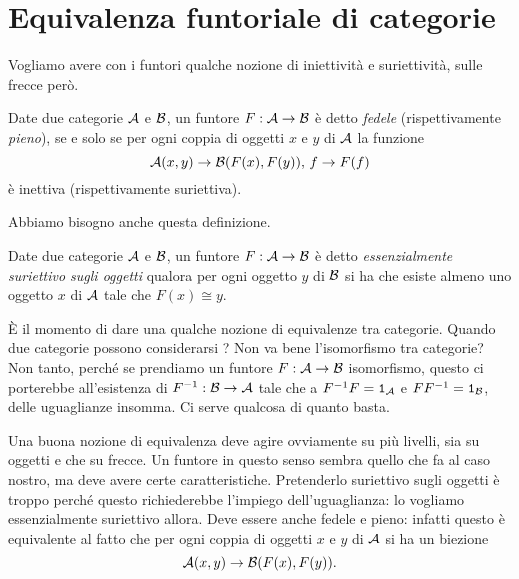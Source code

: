
\section{Equivalenza funtoriale di categorie}

Vogliamo avere con i funtori qualche nozione di iniettività e suriettività, sulle frecce però.

\begin{definizione}
Date due categorie \(\mathcal A\) e \(\mathcal B\), un funtore \(F : \mathcal A \to \mathcal B\) è detto {\em fedele} (rispettivamente {\em pieno}), se e solo se per ogni coppia di oggetti \(x\) e \(y\) di \(\mathcal A\) la funzione
\[\mathcal A(x, y) \to \mathcal B(F(x), F(y)),\, f \to F(f)\]
è inettiva (rispettivamente suriettiva).
\end{definizione}

Abbiamo bisogno anche questa definizione.

\begin{definizione}
Date due categorie \(\mathcal A\) e \(\mathcal B\), un funtore \(F : \mathcal A \to \mathcal B\) è detto {\em essenzialmente suriettivo sugli oggetti} qualora per ogni oggetto \(y\) di \(\mathcal B\) si ha che esiste almeno uno oggetto \(x\) di \(\mathcal A\) tale che \(F(x) \cong y\).
\end{definizione}

È il momento di dare una qualche nozione di equivalenze tra categorie. Quando due categorie possono considerarsi ? Non va bene l'isomorfismo tra categorie? Non tanto, perché se prendiamo un funtore \(F : \mathcal A \to \mathcal B\) isomorfismo, questo ci porterebbe all'esistenza di \(F^{-1} : \mathcal B \to \mathcal A\) tale che a \(F^{-1} F = \mathtt{1}_\mathcal A\) e \(F F^{-1} = \mathtt{1}_\mathcal B\), delle uguaglianze insomma. Ci serve qualcosa di  quanto basta.

Una buona nozione di equivalenza deve agire ovviamente su più livelli, sia su oggetti e che su frecce. Un funtore in questo senso sembra quello che fa al caso nostro, ma deve avere certe caratteristiche. Pretenderlo suriettivo sugli oggetti è troppo perché questo richiederebbe l'impiego dell'uguaglianza: lo vogliamo essenzialmente suriettivo allora. Deve essere anche fedele e pieno: infatti questo è equivalente al fatto che per ogni coppia di oggetti \(x\) e \(y\) di \(\mathcal A\) si ha un biezione
\[\mathcal A(x, y) \to \mathcal B(F(x), F(y)).\]

